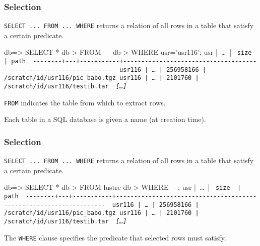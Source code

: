 \documentclass[english,serif,mathserif]{beamer}
\begin{document}
\begin{frame}[fragile]
  \frametitle{Selection}

  \texttt{SELECT ... FROM ... WHERE} returns a relation of all rows in a table
  that satisfy a certain predicate.

  \+
\begin{sql}[basicstyle=\ttfamily\tiny]
db=> SELECT *
db-> FROM ~~
db-> WHERE usr='usr116';
  usr   |~\ldots~|   ~\tt size~    | path
~-{}-{}-{}-{}-{}-{}-{}-{}+{}-{}-{}-{}+{}-{}-{}-{}-{}-{}-{}-{}-{}-{}-{}-{}+{}-{}-{}-{}-{}-{}-{}-{}-{}-{}-{}-{}-{}-{}-{}-{}-{}-{}-{}-{}-{}-{}-{}-{}-{}-{}-{}-{}-{}-{}-{}-{}-{}-{}-{}-{}-{}-{}-{}-{}-{}-{}-{}-{}-{}-{}-{}-{}-{}-{}-{}-{}-{}-{}-{}-{}-{}-{}-{}-{}-{}-{}-{}-{}-{}-{}-{}-{}~
 usr116 |~\ldots~| 256958166 | /scratch/id/usr116/pic_babo.tgz
 usr116 |~\ldots~|   2101760 | /scratch/id/usr116/testib.tar
 ~{\em [\ldots]}~
\end{sql}

\texttt{FROM} indicates the table from which to extract rows.

\+ Each table in a SQL database is given a name (at creation time).
\end{frame}


\begin{frame}[fragile]
  \frametitle{Selection}

  \texttt{SELECT ... FROM ... WHERE} returns a relation of all rows in a table
  that satisfy a certain predicate.

  \+
\begin{sql}[basicstyle=\ttfamily\tiny]
db=> SELECT *
db-> FROM lustre
db-> WHERE ~~;
  usr   |~\ldots~|   ~\tt size~    | path
~-{}-{}-{}-{}-{}-{}-{}-{}+{}-{}-{}-{}+{}-{}-{}-{}-{}-{}-{}-{}-{}-{}-{}-{}+{}-{}-{}-{}-{}-{}-{}-{}-{}-{}-{}-{}-{}-{}-{}-{}-{}-{}-{}-{}-{}-{}-{}-{}-{}-{}-{}-{}-{}-{}-{}-{}-{}-{}-{}-{}-{}-{}-{}-{}-{}-{}-{}-{}-{}-{}-{}-{}-{}-{}-{}-{}-{}-{}-{}-{}-{}-{}-{}-{}-{}-{}-{}-{}-{}-{}-{}-{}~
 usr116 |~\ldots~| 256958166 | /scratch/id/usr116/pic_babo.tgz
 usr116 |~\ldots~|   2101760 | /scratch/id/usr116/testib.tar
 ~{\em [\ldots]}~
\end{sql}

The \texttt{WHERE} clause specifies the predicate that selected rows must
satisfy.
\end{frame}
\end{document}
